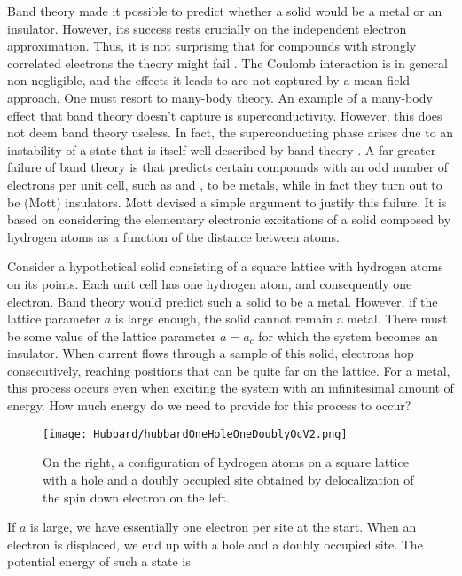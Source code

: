 Band theory made it possible to predict whether a solid would be a metal or an insulator.
However, its success rests crucially on the independent electron approximation.
Thus, it is not surprising that for compounds with strongly correlated electrons the theory might fail \cite{mila_physique_2007}.
The Coulomb interaction is in general non negligible, and the effects it leads to are not captured by a mean field approach.
One must resort to many-body theory.
An example of a many-body effect that band theory doesn't capture is  superconductivity.
However, this does not deem band theory useless.
In fact, the superconducting phase arises due to an instability of a state that is itself well described by band theory \cite{gennes_superconductivity_1999}.
A far greater failure of band theory is that predicts certain compounds with an odd number of electrons per unit cell, such as  and ,  to be metals, while in fact  they turn out to be (Mott) insulators.
Mott devised a simple argument to justify this failure.
It is based on considering the elementary electronic excitations of a solid composed by hydrogen atoms as a function of the distance between atoms.

Consider a hypothetical solid consisting of a square lattice with hydrogen atoms on its points.
Each unit cell has one hydrogen atom, and consequently one electron.
Band theory would predict such a solid to be a metal.
However, if the lattice parameter $a$ is large enough, the solid cannot remain a metal.
There must be some value of the lattice parameter $a = a_c$ for which the system becomes an insulator.
When current flows through a sample of this solid, electrons hop consecutively, reaching positions that can be quite far on the lattice.
For a metal, this process occurs even when exciting the system with an infinitesimal amount of energy.
How much energy do we need to provide for this process to occur?

\begin{figure}[ht!]\label{hubbardOneHoleOneDoublyOc}
\centering
\texttt{[image: Hubbard/hubbardOneHoleOneDoublyOcV2.png]}
\caption[Configuration of the Hubbard model on the square lattice with a hole and a doubly occupied site.]{On the right, a configuration of hydrogen atoms on a square lattice with a hole and a doubly occupied site obtained by delocalization of the spin down electron on the left.}
\end{figure}

If $a$ is large, we have essentially one electron per site at the start.
When an electron is displaced, we end up with a hole and a doubly occupied site.
The potential energy of such a state is

